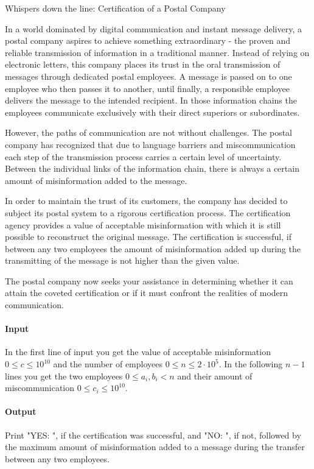 



\makeheader

Whispers down the line: Certification of a Postal Company

In a world dominated by digital communication and instant message delivery, a postal company aspires to achieve something extraordinary - the proven and reliable transmission of information in a traditional manner. 
Instead of relying on electronic letters, this company places its trust in the oral transmission of messages through dedicated postal employees. 
A message is passed on to one employee who then passes it to another, until finally, a responsible employee delivers the message to the intended recipient. 
In those information chains the employees communicate exclusively with their direct superiors or subordinates.

However, the paths of communication are not without challenges. 
The postal company has recognized that due to language barriers and miscommunication each step of the transmission process carries a certain level of uncertainty. 
Between the individual links of the information chain, there is always a certain amount of misinformation added to the message.

In order to maintain the trust of its customers, the company has decided to subject its postal system to a rigorous certification process.
The certification agency provides a value of acceptable misinformation with which it is still possible to reconstruct the original message.
The certification is successful, if between any two employees the amount of misinformation added up during the transmitting of the message is not higher than the given value.

The postal company now seeks your assistance in determining whether it can attain the coveted certification or if it must confront the realities of modern communication.


\paragraph*{Input}

In the first line of input you get the value of acceptable misinformation $0 \leq c \leq 10^{10}$ and the number of employees $0 \leq n \leq 2\cdot 10^5.$
In the following $n-1$ lines you get the two employees $0 \leq a_i, b_i < n$ and their amount of miscommunication $0 \leq c_i \leq 10^{10}.$

\paragraph*{Output}

Print "YES: ", if the certification was successful, and "NO: ", if not, followed by the maximum amount of misinformation added to a message during the transfer between any two employees.

\begin{samples}
\end{samples}


